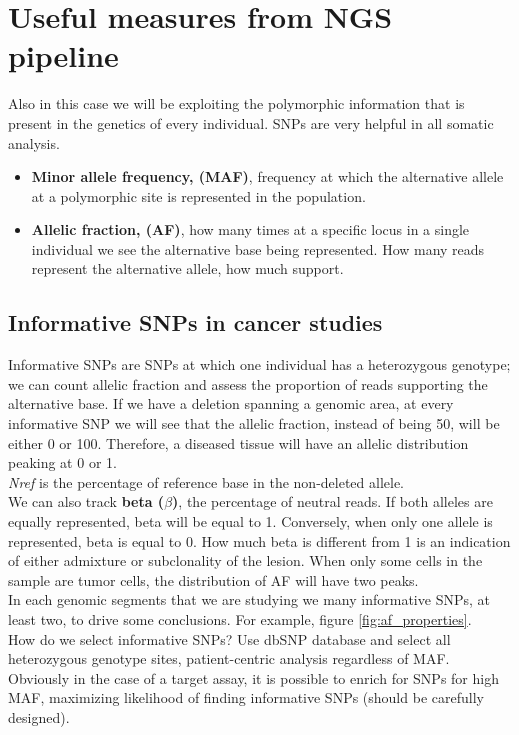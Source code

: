 
\section{Useful measures from NGS pipeline}
Also in this case we will be exploiting the polymorphic information that is present in the genetics of every individual. SNPs are very helpful in all somatic analysis.
\begin{itemize}
\item \textbf{Minor allele frequency, (MAF)}, frequency at which the alternative allele at a polymorphic site is represented in the population.
\item \textbf{Allelic fraction, (AF)}, how many times at a specific locus in a single individual we see the alternative base being represented. How many reads represent the alternative allele, how much support. 
\end{itemize}

\subsection{Informative SNPs in cancer studies}
Informative SNPs are SNPs at which one individual has a heterozygous genotype; we can count allelic fraction and assess the proportion of reads supporting the alternative base. 
If we have a deletion spanning a genomic area, at every informative SNP we will see that the allelic fraction, instead of being 50, will be either 0 or 100. Therefore, a diseased tissue will have an allelic distribution peaking at 0 or 1.
\\
\textit{Nref} is the percentage of reference base in the non-deleted allele.
\\
We can also track \textbf{beta ($\beta$)}, the percentage of neutral reads. If both alleles are equally represented, beta will be equal to 1. 
Conversely, when only one allele is represented, beta is equal to 0. 
How much beta is different from 1 is an indication of either admixture or subclonality of the lesion.
When only some cells in the sample are tumor cells, the distribution of AF will have two peaks. 
\\
In each genomic segments that we are studying we many informative SNPs, at least two, to drive some conclusions. For example, figure \ref{fig:af_properties}.\\
How do we select informative SNPs? Use dbSNP database and select all heterozygous genotype sites, patient-centric analysis regardless of MAF. Obviously in the case of a target assay, it is possible to enrich for SNPs for high MAF, maximizing likelihood of finding informative SNPs (should be carefully designed).

